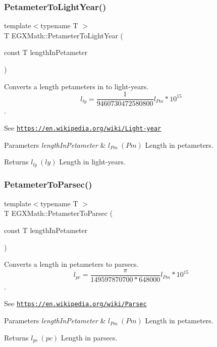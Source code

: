 \subsubsection{\texorpdfstring{Petameter\+To\+Light\+Year()}{PetameterToLightYear()}}
{\footnotesize\ttfamily template$<$typename T $>$ \\
T E\+G\+X\+Math\+::\+Petameter\+To\+Light\+Year (\begin{DoxyParamCaption}\item[{const T}]{length\+In\+Petameter }\end{DoxyParamCaption})}



Converts a length petameters in to light-\/years. \[ l_{ly}= \frac{1}{9460730472580800} l_{Pm} * 10^{15} \]. 

See \href{https://en.wikipedia.org/wiki/Light-year}{\tt https\+://en.\+wikipedia.\+org/wiki/\+Light-\/year} 
\begin{DoxyParams}{Parameters}
{\em length\+In\+Petameter} & $ l_{Pm}\ (Pm)$ Length in petameters. \\
\hline
\end{DoxyParams}
\begin{DoxyReturn}{Returns}
$ l_{ly}\ (ly)$ Length in light-\/years. 
\end{DoxyReturn}
\mbox{\label{group___e_g_x_math-_conversions-_length_conversions-_s_i-_petameter-_astronomical_ga6579583b24214c285978b0e08e163a9d}} 
\subsubsection{\texorpdfstring{Petameter\+To\+Parsec()}{PetameterToParsec()}}
{\footnotesize\ttfamily template$<$typename T $>$ \\
T E\+G\+X\+Math\+::\+Petameter\+To\+Parsec (\begin{DoxyParamCaption}\item[{const T}]{length\+In\+Petameter }\end{DoxyParamCaption})}



Converts a length in petameters to parsecs. \[ l_{pc}=\frac{\pi}{149597870700 * 648000} l_{Pm} * 10^{15} \]. 

See \href{https://en.wikipedia.org/wiki/Parsec}{\tt https\+://en.\+wikipedia.\+org/wiki/\+Parsec} 
\begin{DoxyParams}{Parameters}
{\em length\+In\+Petameter} & $ l_{Pm}\ (Pm)$ Length in petameters. \\
\hline
\end{DoxyParams}
\begin{DoxyReturn}{Returns}
$ l_{pc}\ (pc)$ Length in parsecs. 
\end{DoxyReturn}
